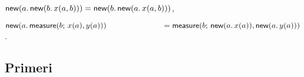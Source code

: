 \begin{axiom}{}\label{ax:K}
    \( \tnew{a}{\tnew{b}{x{\p{a,b}}}} = \tnew{b}{\tnew{a}{x{\p{a,b}}}} \),
\end{axiom}

\begin{axiom}{}\label{ax:L}
    \( \tnew{a}{\tmeasure{b}{x{\p a}}{y{\p a}}}\\
       \text{\hspace{7em}} = \tmeasure{b}{\tnew{a}{x{\p a}}}{\tnew{a}{y{\p a}}} \).
\end{axiom}

\subsection{Primeri}

